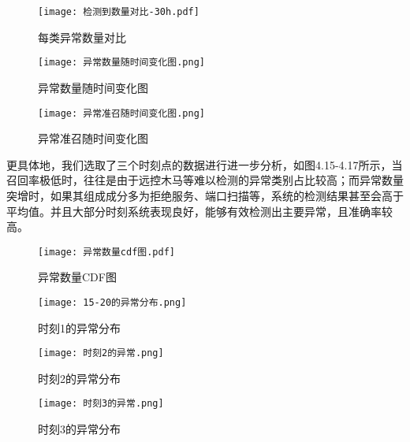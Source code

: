 \begin{figure}[h]
  \centering
  \texttt{[image: 检测到数量对比-30h.pdf]}
  \caption{每类异常数量对比}
  \label{fig:每类异常数量对比}
\end{figure}


\begin{figure}[h]
  \centering
  \texttt{[image: 异常数量随时间变化图.png]}
  \caption{异常数量随时间变化图}
  \label{fig:异常数量}
\end{figure}

\begin{figure}[h]
  \centering
  \texttt{[image: 异常准召随时间变化图.png]}
  \caption{异常准召随时间变化图}
  \label{fig:异常准召}
\end{figure}

更具体地，我们选取了三个时刻点的数据进行进一步分析，如图4.15-4.17所示，当召回率极低时，往往是由于远控木马等难以检测的异常类别占比较高；而异常数量突增时，如果其组成成分多为拒绝服务、端口扫描等，系统的检测结果甚至会高于平均值。并且大部分时刻系统表现良好，能够有效检测出主要异常，且准确率较高。






\begin{figure}[htbp]
  \centering
  \begin{minipage}[t]{0.48\textwidth}
  \centering
  \texttt{[image: 异常数量cdf图.pdf]}
  \caption{异常数量CDF图}
  \end{minipage}
  \begin{minipage}[t]{0.48\textwidth}
  \centering
  \texttt{[image: 15-20的异常分布.png]}
  \caption{时刻1的异常分布}
  \end{minipage}
  \end{figure}

  \begin{figure}[htbp]
    \centering
    \begin{minipage}[t]{0.48\textwidth}
    \centering
    \texttt{[image: 时刻2的异常.png]}
    \caption{时刻2的异常分布}
    \end{minipage}
    \begin{minipage}[t]{0.48\textwidth}
    \centering
    \texttt{[image: 时刻3的异常.png]}
    \caption{时刻3的异常分布}
    \end{minipage}
    \end{figure}

